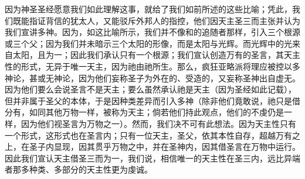 因为神圣圣经愿意我们如此理解这事，就给了我们如前所述的这些比喻；凭此，我们既能指证背信的犹太人，又能驳斥外邦人的指控，他们因天主圣三而主张并认为我们宣讲多神。因为，如这比喻所示，我们并不像和的追随者那样，引入三个根源或三个父；因为我们并未暗示三个太阳的形像，而是太阳与光辉。而光辉中的光来自太阳，且为一；因此我们承认只有一个根源；我们宣认创造万有的圣言，其天主性的形式，无异于唯一天主，因为祂由祂所生。那么，疯狂亚略派将理应被控以多神论，甚或无神论，因为他们妄称圣子为外在的、受造的，又妄称圣神出自虚无。因为他们要么会说圣言不是天主；要么虽然承认祂是天主（因为圣经如此记载），但并非属于圣父的本体，于是因种类差异而引入多神（除非他们竟敢说，祂只是借分有，如同其他万物一样，被称为天主；倘若他们持此观点，他们的不虔仍是一样，因为他们视圣言为万物之一）。然而，我们决不可有此想法。因为天主性只有一个形式，这形式也在圣言内；只有一位天主，圣父，依其本性自存，超越万有之上，在圣子内显现，因其贯乎万物之中，并在圣神内，因其借圣言在万物中运行。因此我们宣认天主借圣三而为一，我们说，相信唯一的天主性在圣三内，远比异端者那多种类、多部分的天主性更为虔诚。\par

